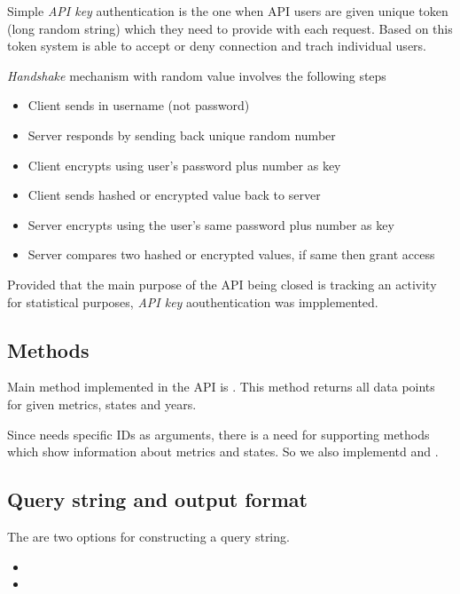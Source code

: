 				Simple  \emph{API key} authentication is the one when API users are given unique token 
				(long random string) which they need to provide with each request. 
				Based on this token system is able to accept or deny connection and trach individual users.
				
				\emph{Handshake} mechanism with random value involves the following steps
				
				\begin{itemize}
					\item
						Client sends in username (not password)
					\item
						Server responds by sending back unique random number
					\item
						Client encrypts using user's password plus number as key
					\item
						Client sends hashed or encrypted value back to server
					\item
						Server encrypts using the user's same password plus number as key
					\item
						Server compares two hashed or encrypted values, if same then grant access
				\end{itemize}
				
				Provided that the main purpose of the API being closed is tracking an activity 
				for statistical purposes, \emph{API key} aouthentication was impplemented.

			\subsection{Methods}
				
				Main method implemented in the API is . 
				This method returns all data points for given metrics, states and years.
				
				Since  needs specific IDs as arguments, there is a need for supporting 
				methods which show information about metrics and states. 
				So we also implementd  and .

			\subsection{Query string and output format}
			
				The are two options for constructing a query string.
				\begin{itemize}
					\item
					\item
				\end{itemize}
				

